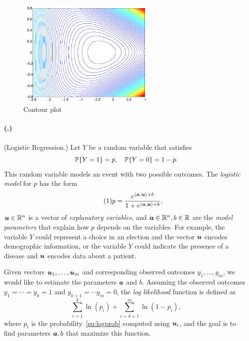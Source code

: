 \documentclass{article}
\newcounter{problemSheetNumber}
\newcounter{problems}
\renewcommand{\problem}{\paragraph{(\theproblemSheetNumber.\theproblems)}\addtocounter{problems}{1}}
\begin{document}
\begin{figure}[h!]
 \centering
 \includegraphics[width=0.6\textwidth]{images/contour_cropped.pdf}
 \caption{Contour plot}\label{fig:contour}
\end{figure}

\problem (Logistic Regression.) Let $Y$ be a random variable that satisfies
 \begin{equation*}
  \mathbb{P}\{Y=1\} = p, \quad \mathbb{P}\{Y=0\} = 1-p.
 \end{equation*}
This random variable models an event with two possible outcomes. The {\em logistic model} for $p$ has the form
\begin{equation}\label{eq:logprob}\tag{1}
 p = \frac{e^{\langle {\bm{a}}, {\bm{u}} \rangle+b}}{1+e^{\langle {\bm{a}}, {\bm{u}} \rangle+b}},
\end{equation}
$\bm{u}\in \mathbb{R}^n$ is a vector of {\em explanatory variables}, and $\bm{a}\in \mathbb{R}^n, b\in \mathbb{R}$ are the {\em model parameters} that explain how $p$ depends on the variables. For example, the variable $Y$ could represent a choice in an election and the vector $\bm{u}$ encodes demographic information, or the variable $Y$ could indicate the presence of a disease and $\bm{u}$ encodes data about a patient.

Given vectors $\bm{u}_1,\dots,\bm{u}_m$ and corresponding observed outcomes $y_1,\dots,y_m$, we would like to estimate the parameters $\bm{a}$ and $b$. Assuming the observed outcomes $y_1=\cdots =y_k=1$ and $y_{k+1}=\cdots y_m=0$, the {\em log likelihood} function is defined as
\begin{equation}\label{eq:mlprod}\tag{2}
 \sum_{i=1}^k \ln(p_i) +\sum_{i=k+1}^m \ln(1-p_i),
\end{equation}
where $p_i$ is the probability~\eqref{eq:logprob} computed using $\bm{u}_i$,
and the goal is to find parameters $\bm{a},b$ that maximize this function.
\end{document}
